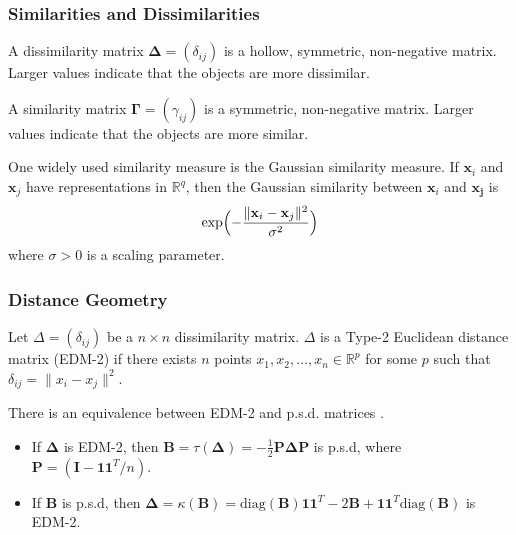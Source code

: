 \documentclass[professionalfonts, hyperref={pdfpagelabels=false,
  colorlinks=true, linkcolor=purple}]{beamer}
\begin{document}
\begin{frame}
  \frametitle{Similarities and Dissimilarities}
  A \alert{dissimilarity matrix} $\bm{\Delta} = (\delta_{ij})$
  is a hollow, symmetric, non-negative matrix. Larger values indicate
  that the objects are more dissimilar. 

  \vskip10pt A \alert{similarity matrix} $\bm{\Gamma} =
  (\gamma_{ij})$ is a symmetric, non-negative matrix. Larger values
  indicate that the objects are more similar. 

  \vskip10pt One widely used similarity measure is the Gaussian
  similarity measure. If $\mathbf{x}_i$ and $\mathbf{x}_j$ have representations
  in $\mathbb{R}^{q}$, then the Gaussian similarity between
  $\mathbf{x}_i$ and $\mathbf{x_j}$ is
  \begin{equation}
    \label{eq:3}
    \exp\Bigl(- \frac{\| \mathbf{x}_i - \mathbf{x}_j \|^{2}}{\sigma^2}\Bigr)
  \end{equation}
  where $\sigma > 0$ is a scaling parameter.
\end{frame}

\begin{frame}
  \frametitle{Distance Geometry}
  \begin{definition}
    \label{def:2}
    Let $\Delta = (\delta_{ij})$ be a $n \times n$ dissimilarity
    matrix. $\Delta$ is a Type-2 Euclidean distance matrix
    (\alert{EDM-2}) if there exists $n$ points $x_1,
    x_2, \dots, x_n \in \mathbb{R}^{p}$ for some $p$ such that $\delta_{ij} = \|
    x_i - x_j \|^2$.
  \end{definition}
 \vskip10pt There is an equivalence between EDM-2 and p.s.d. matrices \cite{schoenberg38:_metric}.
 \begin{itemize}
 \item If $\bm{\Delta}$ is EDM-2, then $\mathbf{B} =
   \tau(\bm{\Delta}) = - \frac{1}{2} \mathbf{P} \bm{\Delta}
   \mathbf{P}$ is p.s.d, where $\mathbf{P} =
   (\mathbf{I} - \bm{1}\bm{1}^{T}/n)$.
 \item If $\bm{B}$ is p.s.d, then
   $\bm{\Delta} = \kappa(\mathbf{B}) = \mathrm{diag}(\mathbf{B})\bm{1}\bm{1}^{T} -
   2\mathbf{B} + \bm{1}\bm{1}^{T}\mathrm{diag}(\mathbf{B})$ is
   EDM-2.
 \end{itemize}
\end{frame}
\end{document}
